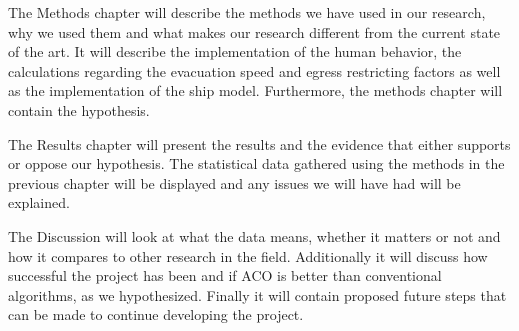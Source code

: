 The Methods chapter will describe the methods we have used in our research, why we used them and what makes
our research different from the current state of the art. It will describe the implementation of the human behavior,
the calculations regarding the evacuation speed and egress restricting factors as well as the implementation of the 
ship model. Furthermore, the methods chapter will contain the hypothesis.

The Results chapter will present the results and the evidence that either supports or oppose our hypothesis. The
statistical data gathered using the methods in the previous chapter will be displayed and any issues we will have had
will be explained.

The Discussion will look at what the data means, whether it matters or not and how it compares to other research in the field.
Additionally it will discuss how successful the project has been and if ACO is better than conventional algorithms, as we hypothesized.
Finally it will contain proposed future steps that can be made to continue developing the project.
